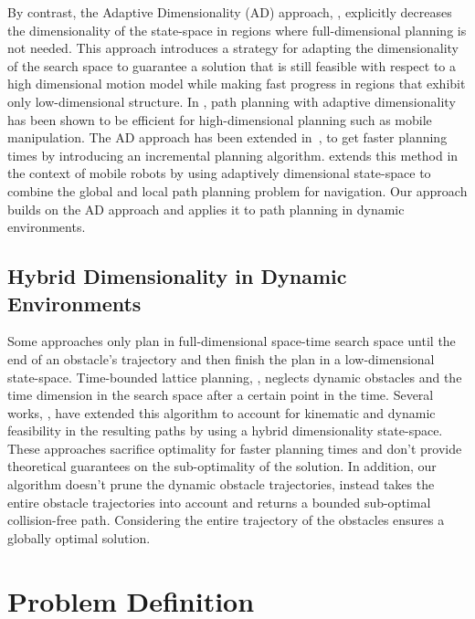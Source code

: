 By contrast, the Adaptive Dimensionality (AD) approach, \cite{gochev2011path}, explicitly decreases the dimensionality of the state-space in regions where full-dimensional planning is not needed. This approach introduces a strategy for adapting the dimensionality of the search space to guarantee a solution that is still feasible with respect to a high dimensional motion model while making fast progress in regions that exhibit only low-dimensional structure. In \cite{gochev2012planning}, path planning with adaptive dimensionality has been shown to be efficient for high-dimensional planning such as mobile manipulation. The AD approach has been extended in~\cite{gochev2013incremental}, to get faster planning times by introducing an incremental planning algorithm. \cite{zhang2012combining} extends this method in the context of mobile robots by using adaptively dimensional state-space to combine the global and local path planning problem for navigation. Our approach builds on the AD approach and applies it to path planning in dynamic environments.

\subsection{Hybrid Dimensionality in Dynamic Environments}
Some approaches only plan in full-dimensional space-time search space until the end of an obstacle's trajectory and then finish the plan in a low-dimensional state-space. Time-bounded lattice planning, \cite{kushleyev2009time}, neglects dynamic obstacles and the time dimension in the search space after a certain point in the time. Several works, \cite{petereit2013mobile,petereit2014combined}, have extended this algorithm to account for kinematic and dynamic feasibility in the resulting paths by using a hybrid dimensionality state-space. These approaches sacrifice optimality for faster planning times and don't provide theoretical guarantees on the sub-optimality of the solution. In addition, our algorithm doesn't prune the dynamic obstacle trajectories, instead takes the entire obstacle trajectories into account and returns a bounded sub-optimal collision-free path. Considering the entire trajectory of the obstacles ensures a globally optimal solution.

\section{Problem Definition}\label{sec:problem}


